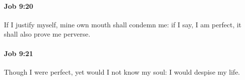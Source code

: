 		\paragraph{Job 9:20} %
			\label{JOB-9-20}

			If I justify myself, mine own mouth shall condemn me: if I say, I am perfect, it shall also prove me perverse.


		\paragraph{Job 9:21} %
			\label{JOB-9-21}

			Though I were perfect, yet would I not know my soul: I would despise my life.


